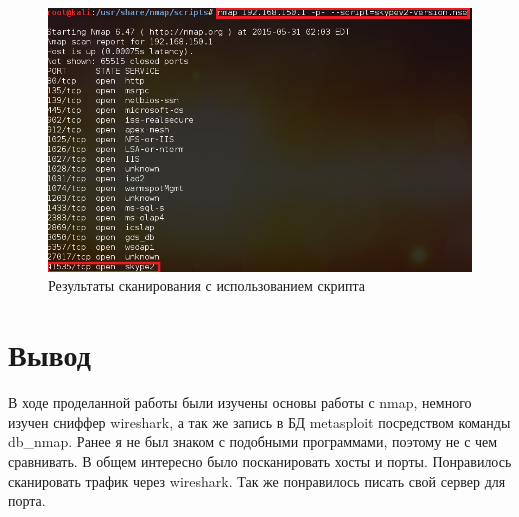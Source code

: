 \documentclass[11pt, a4paper]{article}		%
\begin{document}
\begin{itemize}
\begin{figure}[h!]
\centering
\includegraphics[scale=0.8]{res/script_2}
\caption{Результаты сканирования с использованием скрипта}
\end{figure}

\end{itemize}


\section{Вывод}

В ходе проделанной работы были изучены основы работы с nmap, немного изучен сниффер wireshark, а так же запись в БД metasploit посредством команды db\_nmap. Ранее я не был знаком с подобными программами, поэтому не с чем сравнивать. В общем интересно было посканировать хосты и порты. Понравилось сканировать трафик через wireshark. Так же понравилось писать свой сервер для порта. 
\end{document}
